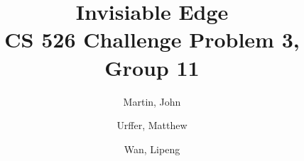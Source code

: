 \documentclass[]{article}
\title{Invisiable Edge\\
CS 526 Challenge Problem 3, Group 11}
\author{
Martin, John \\
\and
Urffer, Matthew \\
\and
Wan, Lipeng \\
}
\begin{document}
\maketitle

\listoftodos






\end{document}
